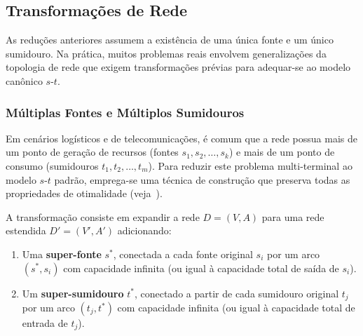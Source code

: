 \documentclass[12pt,a4paper]{article}
\begin{document}
\subsection{Transformações de Rede}

As reduções anteriores assumem a existência de uma única fonte e um único sumidouro. Na prática, muitos problemas reais envolvem generalizações da topologia de rede que exigem transformações prévias para adequar-se ao modelo canônico $s$-$t$.

\subsubsection{Múltiplas Fontes e Múltiplos Sumidouros}

Em cenários logísticos e de telecomunicações, é comum que a rede possua mais de um ponto de geração de recursos (fontes $s_1, s_2, \ldots, s_k$) e mais de um ponto de consumo (sumidouros $t_1, t_2, \ldots, t_m$). Para reduzir este problema multi-terminal ao modelo $s$-$t$ padrão, emprega-se uma técnica de construção que preserva todas as propriedades de otimalidade (veja~\cite{ahuja1993network}).

A transformação consiste em expandir a rede $D = (V, A)$ para uma rede estendida $D' = (V', A')$ adicionando:
\begin{enumerate}
    \item Uma \textbf{super-fonte} $s^*$, conectada a cada fonte original $s_i$ por um arco $(s^*, s_i)$ com capacidade infinita (ou igual à capacidade total de saída de $s_i$).
    \item Um \textbf{super-sumidouro} $t^*$, conectado a partir de cada sumidouro original $t_j$ por um arco $(t_j, t^*)$ com capacidade infinita (ou igual à capacidade total de entrada de $t_j$).
\end{enumerate}
\end{document}
